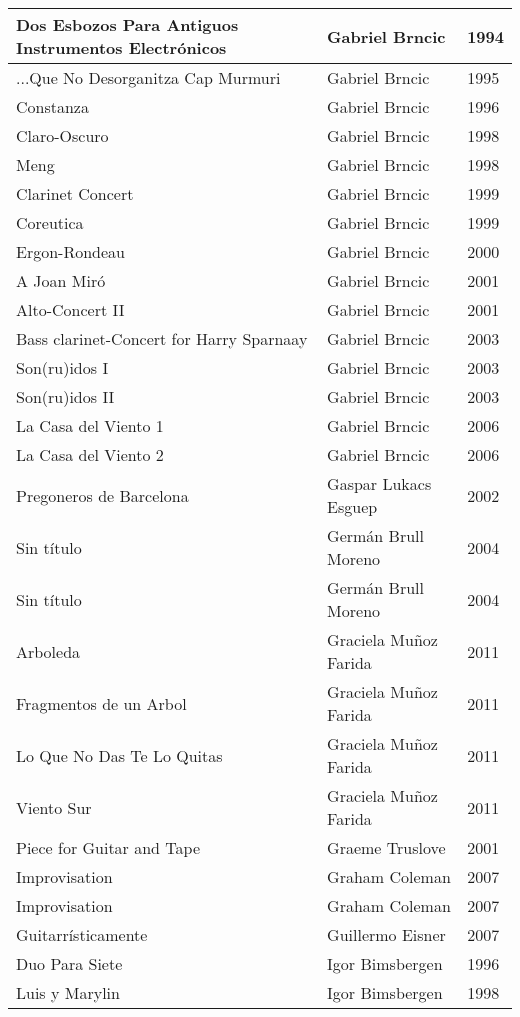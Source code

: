 \begin{center}
\begin{longtable}{| p{} | p{} | p{} |}
Dos Esbozos Para Antiguos Instrumentos Electrónicos & Gabriel Brncic & 1994 \\ \hline 
...Que No Desorganitza Cap Murmuri & Gabriel Brncic & 1995 \\ \hline 
Constanza & Gabriel Brncic & 1996 \\ \hline 
Claro-Oscuro & Gabriel Brncic & 1998 \\ \hline 
Meng & Gabriel Brncic & 1998 \\ \hline 
Clarinet Concert & Gabriel Brncic & 1999 \\ \hline 
Coreutica & Gabriel Brncic & 1999 \\ \hline 
Ergon-Rondeau & Gabriel Brncic & 2000 \\ \hline 
A Joan Miró & Gabriel Brncic & 2001 \\ \hline 
Alto-Concert II & Gabriel Brncic & 2001 \\ \hline 
Bass clarinet-Concert for Harry Sparnaay & Gabriel Brncic & 2003 \\ \hline 
Son(ru)idos I & Gabriel Brncic & 2003 \\ \hline 
Son(ru)idos II & Gabriel Brncic & 2003 \\ \hline 
La Casa del Viento 1 & Gabriel Brncic & 2006 \\ \hline 
La Casa del Viento 2 & Gabriel Brncic & 2006 \\ \hline 
Pregoneros de Barcelona & Gaspar Lukacs Esguep & 2002 \\ \hline 
Sin título & Germán Brull Moreno & 2004 \\ \hline 
Sin título & Germán Brull Moreno & 2004 \\ \hline 
Arboleda & Graciela Muñoz Farida & 2011 \\ \hline 
Fragmentos de un Arbol & Graciela Muñoz Farida & 2011 \\ \hline 
Lo Que No Das Te Lo Quitas & Graciela Muñoz Farida & 2011 \\ \hline 
Viento Sur & Graciela Muñoz Farida & 2011 \\ \hline 
Piece for Guitar and Tape & Graeme Truslove & 2001 \\ \hline 
Improvisation & Graham Coleman & 2007 \\ \hline 
Improvisation & Graham Coleman & 2007 \\ \hline 
Guitarrísticamente & Guillermo Eisner & 2007 \\ \hline 
Duo Para Siete & Igor Bimsbergen & 1996 \\ \hline 
Luis y Marylin & Igor Bimsbergen & 1998 \\ \hline 

\end{longtable}
\end{center}
